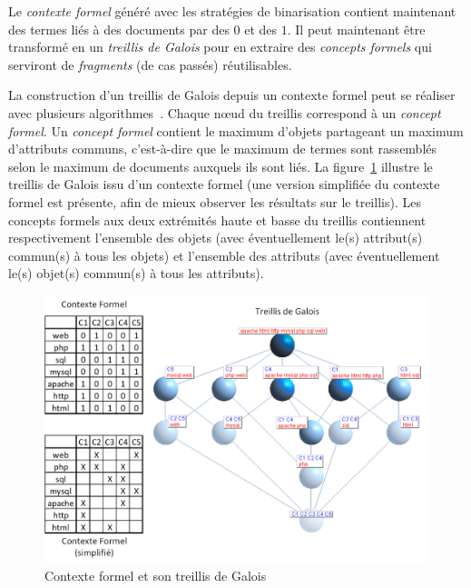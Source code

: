 Le \textit{contexte formel} généré avec les stratégies de binarisation contient maintenant des termes liés à des documents par des $ 0 $ et des $ 1 $.
Il peut maintenant être transformé en un \textit{treillis de Galois} pour en extraire des \textit{concepts formels} qui serviront de \textit{fragments} (de cas passés) réutilisables.

\bigskip

La construction d'un treillis de Galois depuis un contexte formel peut se réaliser avec plusieurs algorithmes~\cite{messai2009analyse}.
Chaque n\oe{}ud du treillis correspond à un \textit{concept formel}.
Un \textit{concept formel} contient le maximum d'objets partageant un maximum d'attributs communs, c'est-à-dire que le maximum de termes sont rassemblés selon le maximum de documents auxquels ils sont liés.
La figure~\ref{figure:2-S2-Treillis-Construction-Treillis} illustre le treillis de Galois issu d'un contexte formel (une version simplifiée du contexte formel est présente, afin de mieux observer les résultats sur le treillis).
Les concepts formels aux deux extrémités haute et basse du treillis contiennent respectivement l'ensemble des objets (avec éventuellement le(s) attribut(s) commun(s) à tous les objets) et l'ensemble des attributs (avec éventuellement le(s) objet(s) commun(s) à tous les attributs).

\begin{figure}[ht]
\centering
\centerline{  %
\includegraphics[scale=1]{2-Etat-de-l'Art/images/ACF/Treillis/exemple_treillis_ExampleMediumMatrix-S-B-B-0.00.png}
}
\caption{Contexte formel et son treillis de Galois}
\label{figure:2-S2-Treillis-Construction-Treillis}
\end{figure}

